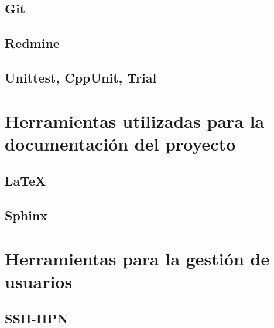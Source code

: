 \subsection{Git}

\subsection{Redmine}

\subsection{Unittest, CppUnit, Trial}

\section{Herramientas utilizadas para la documentación del proyecto}

\subsection{\LaTeX}

\subsection{Sphinx}

\section{Herramientas para la gestión de usuarios}

\subsection{SSH-HPN}

